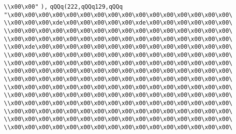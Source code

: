 \verb|\\x00\x00"|\newline
\verb|),|\newline
\verb|qQQq(222,qQQq129,qQQq|\newline
\verb|"\x00\x00\x00\x00\x00\x00\x00\x00\x00\x00\x00\x00\x00\x00\x00\x00\|\newline
\verb|\\x00\x00\x00\xde\x00\x00\x00\x00\x00\xde\x00\x00\x00\x00\x00\x00\|\newline
\verb|\\x00\x00\x00\x00\x00\x00\x00\x00\x00\x00\x00\x00\x00\x00\x00\x00\|\newline
\verb|\\x00\x00\x00\x00\x00\x00\x00\x00\x00\x00\x00\x00\x00\x00\x00\x00\|\newline
\verb|\\x00\xde\x00\x00\x00\x00\x00\x00\x00\x00\x00\x00\x00\x00\x00\x00\|\newline
\verb|\\x00\x00\x00\x00\x00\x00\x00\x00\x00\x00\x00\x00\x00\x00\x00\x00\|\newline
\verb|\\x00\x00\x00\x00\x00\x00\x00\x00\x00\x00\x00\x00\x00\x00\x00\x00\|\newline
\verb|\\x00\x00\x00\x00\x00\x00\x00\x00\x00\x00\x00\x00\x00\x00\x00\x00\|\newline
\verb|\\x00\x00\x00\x00\x00\x00\x00\x00\x00\x00\x00\x00\x00\x00\x00\x00\|\newline
\verb|\\x00\x00\x00\x00\x00\x00\x00\x00\x00\x00\x00\x00\x00\x00\x00\x00\|\newline
\verb|\\x00\x00\x00\x00\x00\x00\x00\x00\x00\x00\x00\x00\x00\x00\x00\x00\|\newline
\verb|\\x00\x00\x00\x00\x00\x00\x00\x00\x00\x00\x00\x00\x00\x00\x00\x00\|\newline
\verb|\\x00\x00\x00\x00\x00\x00\x00\x00\x00\x00\x00\x00\x00\x00\x00\x00\|\newline
\verb|\\x00\x00\x00\x00\x00\x00\x00\x00\x00\x00\x00\x00\x00\x00\x00\x00\|\newline
\verb|\\x00\x00\x00\x00\x00\x00\x00\x00\x00\x00\x00\x00\x00\x00\x00\x00\|\newline
